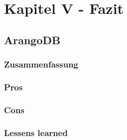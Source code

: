 \chapter{Kapitel V - Fazit}
\setcounter{section}{7}
\section{ArangoDB}

\subsection{Zusammenfassung}

\subsection{Pros}

\subsection{Cons}

\subsection{Lessens learned}
